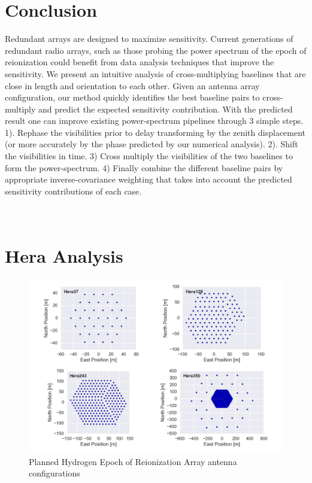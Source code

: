 \documentclass[preprint2,numberedappendix,tighten,twocolappendix]{aastex6}  %
\renewcommand\[{\begin{equation}}
\renewcommand\]{\end{equation}}
\begin{document}
\section{Conclusion}
Redundant arrays are designed to maximize sensitivity. Current generations of redundant radio arrays, such as those probing the power spectrum of the epoch of reionization could benefit from data analysis techniques that improve the sensitivity. We present an intuitive analysis of cross-multiplying baselines that are close in length and orientation to each other. Given an antenna array configuration, our method quickly identifies the best baseline pairs to cross-multiply and predict the expected sensitivity contribution. With the predicted result one can improve existing power-spectrum pipelines through 3 simple steps. 1). Rephase the visibilities prior to delay transforming by the zenith displacement (or more accurately by the phase predicted by our numerical analysis). 2). Shift the visibilities in time. 3) Cross multiply the visibilities of the two baselines  to form the power-spectrum. 4) Finally combine the different baseline pairs by appropriate inverse-covariance weighting that takes into account the predicted sensitivity contributions of each case. 

\appendix
\section{\\Hera Analysis}
\begin{widetext}
\begin{figure}[H]
\includegraphics[scale=0.55]{HeraAntpos}

\caption{Planned Hydrogen Epoch of Reionization Array antenna configurations\label{fig:HeraAntpos}}
\end{figure}
\end{widetext}


\end{document}
